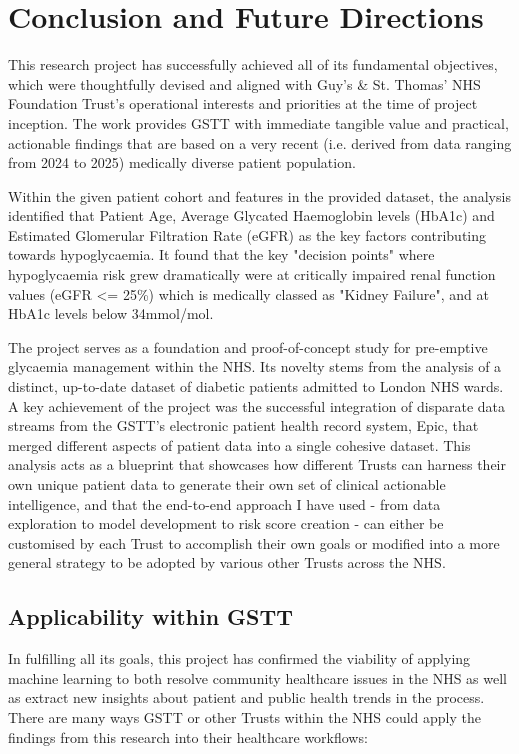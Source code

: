 \section{Conclusion and Future Directions}
	\noindent This research project has successfully achieved all of its fundamental objectives, which were thoughtfully devised and aligned with Guy's \& St. Thomas' NHS Foundation Trust's operational interests and priorities at the time of project inception. The work provides GSTT with immediate tangible value and practical, actionable findings that are based on a very recent (i.e. derived from data ranging from 2024 to 2025) medically diverse patient population.

	\vspace{5pt}
	\noindent Within the given patient cohort and features in the provided dataset,  the analysis identified that Patient Age, Average Glycated Haemoglobin levels (HbA1c) and Estimated Glomerular Filtration Rate (eGFR) as the key factors contributing towards hypoglycaemia. It found that the key "decision points" where hypoglycaemia risk grew dramatically were at critically impaired renal function values (eGFR \textless= 25\%) which is medically classed as "Kidney Failure", and at HbA1c levels below 34mmol/mol.
	
	\vspace{5pt}
	\noindent The project serves as a foundation and proof-of-concept study for pre-emptive glycaemia management within the NHS. Its novelty stems from the analysis of a distinct, up-to-date dataset of diabetic patients admitted to London NHS wards. A key achievement of the project was the successful integration of disparate data streams from the GSTT's electronic patient health record system, Epic, that merged different aspects of patient data into a single cohesive dataset. This analysis acts as a blueprint that showcases how different Trusts can harness their own unique patient data to generate their own set of clinical actionable intelligence, and that the end-to-end approach I have used - from data exploration to model development to risk score creation - can either be customised by each Trust to accomplish their own goals or modified into a more general strategy to be adopted by various other Trusts across the NHS.

\subsection{Applicability within GSTT}
	\noindent In fulfilling all its goals, this project has confirmed the viability of applying machine learning to both resolve community healthcare issues in the NHS as well as extract new insights about patient and public health trends in the process. There are many ways GSTT or other Trusts within the NHS could apply the findings from this research into their healthcare workflows:

